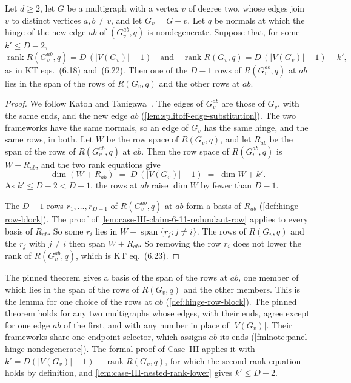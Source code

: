 \begin{lemma}
  \label{lem:case-III-claim-6-11}
  \leanok
  Let $d \ge 2$, let $G$ be a multigraph with a vertex $v$ of degree
  two, whose edges join $v$ to distinct vertices $a, b \neq v$, and let
  $G_v = G - v$. Let $q$ be normals at which the hinge of the new edge
  $ab$ of $(G_v^{ab}, q)$ is nondegenerate. Suppose that, for some
  $k' \le D - 2$,
  \[
    \operatorname{rank} R(G_v^{ab}, q) = D\,(|V(G_v)| - 1)
    \quad\text{and}\quad
    \operatorname{rank} R(G_v, q) = D\,(|V(G_v)| - 1) - k',
  \]
  as in KT eqs.~(6.18) and~(6.22). Then one of the $D - 1$ rows of
  $R(G_v^{ab}, q)$ at $ab$ lies in the span of the rows of $R(G_v, q)$
  and the other rows at $ab$.
\end{lemma}
\begin{proof}
  \leanok
  We follow Katoh and Tanigawa~\cite[p.~685]{katohTanigawa2011}. The
  edges of $G_v^{ab}$ are those of $G_v$, with the same ends, and the
  new edge $ab$ (\cref{lem:splitoff-edge-substitution}). The two
  frameworks have the same normals, so an edge of $G_v$ has the same
  hinge, and the same rows, in both. Let $W$ be the row space of
  $R(G_v, q)$, and let $R_{ab}$ be the span of the rows of
  $R(G_v^{ab}, q)$ at $ab$. Then the row space of $R(G_v^{ab}, q)$ is
  $W + R_{ab}$, and the two rank equations give
  \[
    \dim (W + R_{ab}) \;=\; D\,(|V(G_v)| - 1) \;=\; \dim W + k'.
  \]
  As $k' \le D - 2 < D - 1$, the rows at $ab$ raise $\dim W$ by fewer
  than $D - 1$.

  The $D - 1$ rows $r_1, \dots, r_{D-1}$ of $R(G_v^{ab}, q)$ at $ab$
  form a basis of $R_{ab}$ (\cref{def:hinge-row-block}). The proof of
  \cref{lem:case-III-claim-6-11-redundant-row} applies to every basis of
  $R_{ab}$. So some $r_i$ lies in
  $W + \operatorname{span}\{r_j : j \neq i\}$.
  The rows of $R(G_v, q)$ and the $r_j$ with $j \neq i$ then span
  $W + R_{ab}$. So removing the row $r_i$ does not lower the rank of
  $R(G_v^{ab}, q)$, which is KT eq.~(6.23).
\end{proof}

\begin{fmlnote}
  The pinned theorem gives a basis of the span of the rows at $ab$, one
  member of which lies in the span of the rows of $R(G_v, q)$ and the
  other members. This is the lemma for one choice of the rows at $ab$
  (\cref{def:hinge-row-block}). The pinned theorem holds for any two
  multigraphs whose edges, with their ends, agree except for one edge
  $ab$ of the first, and with any number in place of $|V(G_v)|$. Their
  frameworks share one endpoint selector, which assigns $ab$ its ends
  (\cref{fmlnote:panel-hinge-nondegenerate}). The formal proof of
  Case~III applies it with
  $k' = D(|V(G_v)| - 1) - \operatorname{rank} R(G_v, q)$, for which the
  second rank equation holds by definition, and
  \cref{lem:case-III-nested-rank-lower} gives $k' \le D - 2$.
\end{fmlnote}

